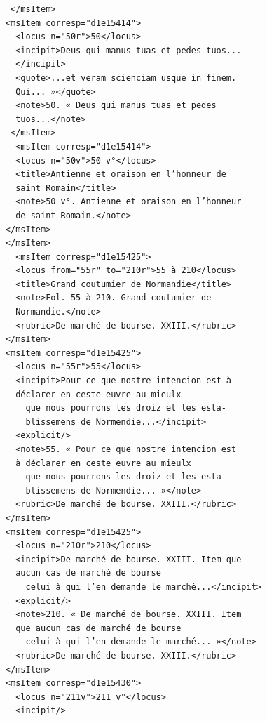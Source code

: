 \documentclass[a4paper,12pt,twoside]{book}
\begin{document}
\begin{verbatim}
                   </msItem>
                  <msItem corresp="d1e15414">
                    <locus n="50r">50</locus>
                    <incipit>Deus qui manus tuas et pedes tuos...
                    </incipit>
                    <quote>...et veram scienciam usque in finem. 
                    Qui... »</quote>
                    <note>50. « Deus qui manus tuas et pedes 
                    tuos...</note>
                   </msItem>
                    <msItem corresp="d1e15414">
                    <locus n="50v">50 v°</locus>
                    <title>Antienne et oraison en l’honneur de
                    saint Romain</title>
                    <note>50 v°. Antienne et oraison en l’honneur 
                    de saint Romain.</note>
                  </msItem>
                  </msItem>
                    <msItem corresp="d1e15425">
                    <locus from="55r" to="210r">55 à 210</locus>
                    <title>Grand coutumier de Normandie</title>
                    <note>Fol. 55 à 210. Grand coutumier de 
                    Normandie.</note>
                    <rubric>De marché de bourse. XXIII.</rubric>
                  </msItem>
                  <msItem corresp="d1e15425">
                    <locus n="55r">55</locus>
                    <incipit>Pour ce que nostre intencion est à 
                    déclarer en ceste euvre au mieulx
                      que nous pourrons les droiz et les esta- 
                      blissemens de Normendie...</incipit>
                    <explicit/>
                    <note>55. « Pour ce que nostre intencion est 
                    à déclarer en ceste euvre au mieulx
                      que nous pourrons les droiz et les esta-
                      blissemens de Normendie... »</note>
                    <rubric>De marché de bourse. XXIII.</rubric>
                  </msItem>
                  <msItem corresp="d1e15425">
                    <locus n="210r">210</locus>
                    <incipit>De marché de bourse. XXIII. Item que 
                    aucun cas de marché de bourse
                      celui à qui l’en demande le marché...</incipit>
                    <explicit/>
                    <note>210. « De marché de bourse. XXIII. Item
                    que aucun cas de marché de bourse
                      celui à qui l’en demande le marché... »</note>
                    <rubric>De marché de bourse. XXIII.</rubric>
                  </msItem>
                  <msItem corresp="d1e15430">
                    <locus n="211v">211 v°</locus>
                    <incipit/>

\end{verbatim}
\end{document}
